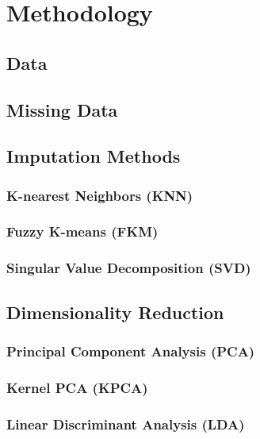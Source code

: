 \documentclass[../thesis.tex]{subfiles}
\begin{document}
\chapter{Methodology}
\label{chap:method}

\section{Data}

\section{Missing Data}

\newpage

\section{Imputation Methods}

\subsection{K-nearest Neighbors (KNN)}

\subsection{Fuzzy K-means (FKM)}

\subsection{Singular Value Decomposition (SVD)}

\newpage

\section{Dimensionality Reduction}

\subsection{Principal Component Analysis (PCA)}

\subsection{Kernel PCA (KPCA)}

\subsection{Linear Discriminant Analysis (LDA)}
\end{document}
